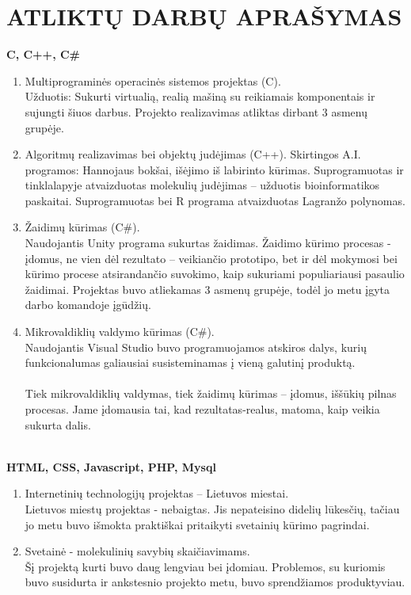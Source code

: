 \documentclass[a4paper,12pt]{article}
\begin{document}
\clearpage

\section{ATLIKTŲ DARBŲ APRAŠYMAS}

\textbf{C, C++, C\#}
\begin{enumerate}
	\item Multiprograminės operacinės sistemos projektas (C). \\
	Užduotis: Sukurti virtualią, realią mašiną su reikiamais komponentais ir sujungti šiuos darbus. Projekto realizavimas atliktas dirbant 3 asmenų grupėje. 
	
	\item Algoritmų realizavimas bei objektų judėjimas (C++). 
	Skirtingos A.I. programos: Hannojaus bokšai, išėjimo iš labirinto kūrimas.
Suprogramuotas ir tinklalapyje atvaizduotas molekulių judėjimas – užduotis bioinformatikos paskaitai.
Suprogramuotas bei R programa atvaizduotas Lagranžo polynomas.
	\item Žaidimų kūrimas (C\#).\\
	Naudojantis Unity programa sukurtas žaidimas. 
Žaidimo kūrimo procesas - įdomus, ne vien dėl rezultato – veikiančio prototipo, bet ir dėl mokymosi bei kūrimo procese atsirandančio suvokimo, kaip sukuriami populiariausi pasaulio žaidimai.  
Projektas buvo atliekamas 3 asmenų grupėje, todėl jo metu įgyta darbo komandoje įgūdžių.
	\item Mikrovaldiklių valdymo kūrimas (C\#).\\
	Naudojantis Visual Studio buvo programuojamos atskiros dalys, kurių funkcionalumas galiausiai susisteminamas į vieną galutinį produktą. \\\\
Tiek mikrovaldiklių valdymas, tiek žaidimų kūrimas – įdomus, iššūkių pilnas procesas. Jame įdomausia tai, kad rezultatas-realus, matoma, kaip veikia sukurta dalis.\\\\

\end{enumerate}


\textbf{HTML, CSS, Javascript, PHP, Mysql }
\begin{enumerate}
	\item Internetinių technologijų projektas – Lietuvos miestai.\\
Lietuvos miestų projektas - nebaigtas. Jis nepateisino didelių lūkesčių, tačiau jo metu buvo išmokta praktiškai pritaikyti svetainių kūrimo pagrindai.
	\item Svetainė - molekulinių savybių skaičiavimams.\\
	Šį projektą kurti buvo daug lengviau bei įdomiau. Problemos, su kuriomis buvo susidurta ir ankstesnio projekto metu, buvo sprendžiamos produktyviau.  \\\\
\end{enumerate}
\end{document}

